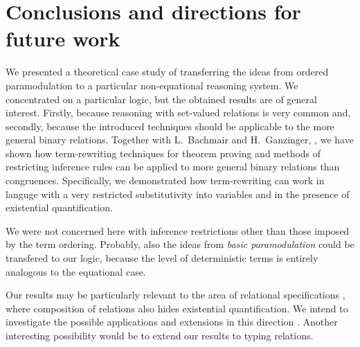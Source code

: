 \section{Conclusions and directions for future work}

We presented a theoretical case study of transferring the ideas from ordered
paramodulation to a particular non-equational reasoning system.  We
concentrated on a particular logic, but the obtained results are of general
interest. Firstly, because reasoning with set-valued relations is very common
and, secondly, because the introduced techniques should be applicable to the
more general binary relations.  Together with L.~Bachmair and H.~Ganzinger,
\cite {BG249,BG-Oslo}, we have shown how term-rewriting techniques for
theorem proving and methods of restricting inference rules can be applied to
more general binary relations than congruences.  Specifically, we
demonstrated how term-rewriting can work in languge with a very restricted
substitutivity into variables and in the presence of existential
quantification.

We were not concerned here with inference restrictions other than those
imposed by the term ordering.  Probably, also the ideas from {\em basic
paramodulation} \cite{Basic-par} could be transfered to our logic, because
the level of deterministic terms is entirely analogous to the equational
case.

Our results may be particularly relevant to the area of relational
specifications \cite {rel-spec}, where composition of relations also hides
existential quantification.  We intend to investigate the possible
applications and extensions in this direction \cite {KMW}.  Another
interesting possibility would be to extend our results to typing relations.

